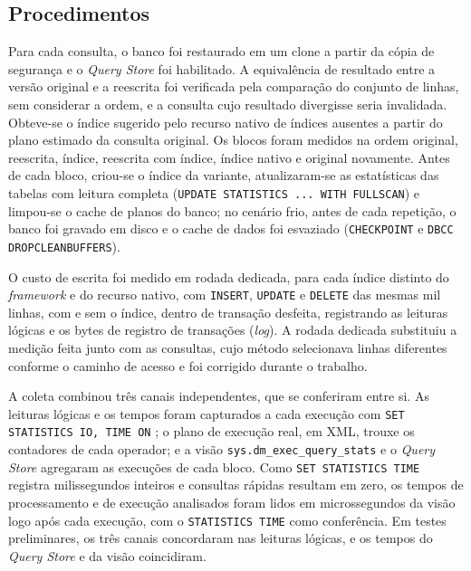 \subsection{Procedimentos}\label{sec:procedimentos}

Para cada consulta, o banco foi restaurado em um clone a partir da cópia de segurança e o \textit{Query Store} foi habilitado. A equivalência de resultado entre a versão original e a reescrita foi verificada pela comparação do conjunto de linhas, sem considerar a ordem, e a consulta cujo resultado divergisse seria invalidada. Obteve-se o índice sugerido pelo recurso nativo de índices ausentes a partir do plano estimado da consulta original. Os blocos foram medidos na ordem original, reescrita, índice, reescrita com índice, índice nativo e original novamente. Antes de cada bloco, criou-se o índice da variante, atualizaram-se as estatísticas das tabelas com leitura completa (\texttt{UPDATE STATISTICS ... WITH FULLSCAN}) e limpou-se o cache de planos do banco; no cenário frio, antes de cada repetição, o banco foi gravado em disco e o cache de dados foi esvaziado (\texttt{CHECKPOINT} e \texttt{DBCC DROPCLEANBUFFERS}).

O custo de escrita foi medido em rodada dedicada, para cada índice distinto do \textit{framework} e do recurso nativo, com \texttt{INSERT}, \texttt{UPDATE} e \texttt{DELETE} das mesmas mil linhas, com e sem o índice, dentro de transação desfeita, registrando as leituras lógicas e os bytes de registro de transações (\textit{log}). A rodada dedicada substituiu a medição feita junto com as consultas, cujo método selecionava linhas diferentes conforme o caminho de acesso e foi corrigido durante o trabalho.

A coleta combinou três canais independentes, que se conferiram entre si. As leituras lógicas e os tempos foram capturados a cada execução com \texttt{SET STATISTICS IO, TIME ON} \cite{rusanu2014perf, fritchey2018qpt}; o plano de execução real, em XML, trouxe os contadores de cada operador; e a visão \texttt{sys.dm\_exec\_query\_stats} e o \textit{Query Store} agregaram as execuções de cada bloco. Como \texttt{SET STATISTICS TIME} registra milissegundos inteiros e consultas rápidas resultam em zero, os tempos de processamento e de execução analisados foram lidos em microssegundos da visão logo após cada execução, com o \texttt{STATISTICS TIME} como conferência. Em testes preliminares, os três canais concordaram nas leituras lógicas, e os tempos do \textit{Query Store} e da visão coincidiram.

